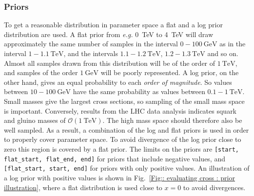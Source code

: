 \documentclass[twoside,english]{uiofysmaster}
\begin{document}
{\subsubsection{Priors}





To get a reasonable distribution in parameter space a flat and a log prior distribution are used. A flat prior from \textit{e.g.} 0~TeV to 4~TeV will draw approximately the same number of samples in the interval $0-100~\mathrm{GeV}$ as in the interval $1-1.1~\mathrm{TeV}$, and the intervals $1.1-1.2~\mathrm{TeV}$,  $1.2-1.3~\mathrm{TeV}$ and so on. Almost all samples drawn from this distribution will be of the order of $1~\mathrm{TeV}$, and samples of the order $1~\mathrm{GeV}$ will be poorly represented. A log prior, on the other hand, gives an equal probability to each \textit{order of magnitude}. So values between $10-100~\mathrm{GeV}$ have the same probability as values between $0.1-1~\mathrm{TeV}$. Small masses give the largest cross sections, so sampling of the small mass space is important. Conversely, results from the LHC data analysis indicates squark and gluino masses of $\mathcal{O}(1~\mathrm{TeV})$. The high mass space should therefore also be well sampled. As a result, a combination of the log and flat priors is used in order to properly cover parameter space. To avoid divergence of the log prior close to zero this region is covered by a flat prior. The limits on the priors are \verb|[start, flat_start, flat_end, end]| for priors that include negative values, and \verb|[flat_start, start, end]| for priors with only positive values. An illustration of a log prior with positive values is shown in Fig.~\ref{Fig:: evaluating cross : prior illustration}, where a flat distribution is used close to $x=0$ to avoid divergences.

}
\end{document}
